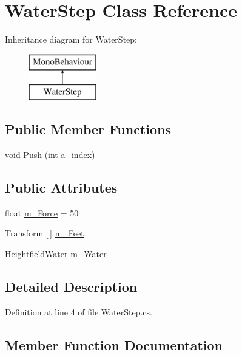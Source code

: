 \hypertarget{class_water_step}{}\section{Water\+Step Class Reference}
\label{class_water_step}
Inheritance diagram for Water\+Step\+:\begin{figure}[H]
\begin{center}
\leavevmode
\includegraphics[height=2.000000cm]{class_water_step}
\end{center}
\end{figure}
\subsection*{Public Member Functions}
\begin{DoxyCompactItemize}
\item 
void \mbox{\hyperlink{class_water_step_a6f8d7a68e5598c6d04e71769a3686f66}{Push}} (int a\+\_\+index)
\end{DoxyCompactItemize}
\subsection*{Public Attributes}
\begin{DoxyCompactItemize}
\item 
float \mbox{\hyperlink{class_water_step_a217c01cdaeb90ab2d85a0afefc8cc249}{m\+\_\+\+Force}} = 50
\item 
Transform \mbox{[}$\,$\mbox{]} \mbox{\hyperlink{class_water_step_a932bd8f50774e29fc2bcdcb9d1fbf0fe}{m\+\_\+\+Feet}}
\item 
\mbox{\hyperlink{class_heightfield_water}{Heightfield\+Water}} \mbox{\hyperlink{class_water_step_a31364632b410b9192c1e7db08d001a4f}{m\+\_\+\+Water}}
\end{DoxyCompactItemize}


\subsection{Detailed Description}


Definition at line 4 of file Water\+Step.\+cs.



\subsection{Member Function Documentation}
\mbox{\label{class_water_step_a6f8d7a68e5598c6d04e71769a3686f66}} 
